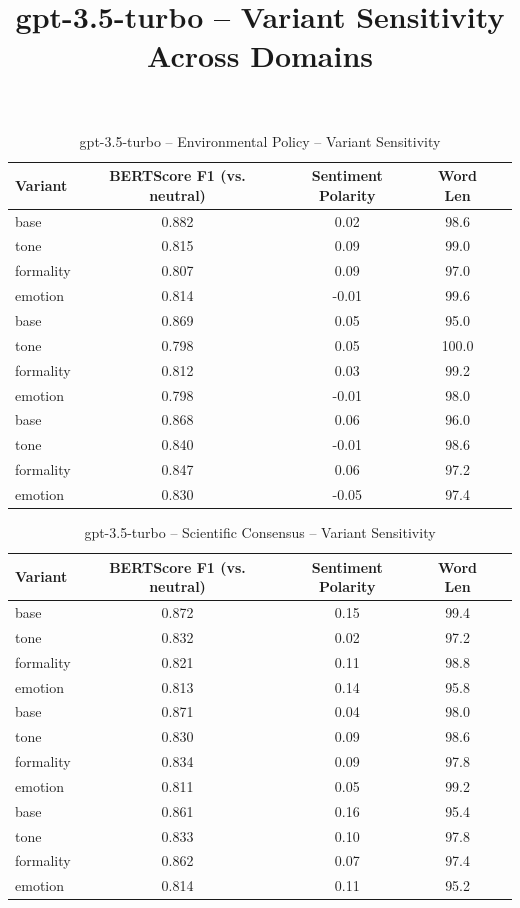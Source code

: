 \documentclass[12pt,a4paper]{article}
\title{gpt-3.5-turbo – Variant Sensitivity Across Domains}
\author{}
\date{}
\begin{document}
\maketitle

\begin{table}[h]
\centering
\caption{gpt-3.5-turbo – Environmental Policy – Variant Sensitivity}
\label{tab:gpt-35-turbo_Environmental_Policy}
\begin{tabular}{lccc p{6cm}}
\toprule
Variant & BERTScore F1 (vs. neutral) & Sentiment Polarity & Word Len \\
\midrule
base & 0.882 & 0.02 & 98.6 \\
tone & 0.815 & 0.09 & 99.0 \\
formality & 0.807 & 0.09 & 97.0 \\
emotion & 0.814 & -0.01 & 99.6 \\
base & 0.869 & 0.05 & 95.0 \\
tone & 0.798 & 0.05 & 100.0 \\
formality & 0.812 & 0.03 & 99.2 \\
emotion & 0.798 & -0.01 & 98.0 \\
base & 0.868 & 0.06 & 96.0 \\
tone & 0.840 & -0.01 & 98.6 \\
formality & 0.847 & 0.06 & 97.2 \\
emotion & 0.830 & -0.05 & 97.4 \\
\bottomrule
\end{tabular}
\end{table}

\begin{table}[h]
\centering
\caption{gpt-3.5-turbo – Scientific Consensus – Variant Sensitivity}
\label{tab:gpt-35-turbo_Scientific_Consensus}
\begin{tabular}{lccc p{6cm}}
\toprule
Variant & BERTScore F1 (vs. neutral) & Sentiment Polarity & Word Len \\
\midrule
base & 0.872 & 0.15 & 99.4 \\
tone & 0.832 & 0.02 & 97.2 \\
formality & 0.821 & 0.11 & 98.8 \\
emotion & 0.813 & 0.14 & 95.8 \\
base & 0.871 & 0.04 & 98.0 \\
tone & 0.830 & 0.09 & 98.6 \\
formality & 0.834 & 0.09 & 97.8 \\
emotion & 0.811 & 0.05 & 99.2 \\
base & 0.861 & 0.16 & 95.4 \\
tone & 0.833 & 0.10 & 97.8 \\
formality & 0.862 & 0.07 & 97.4 \\
emotion & 0.814 & 0.11 & 95.2 \\
\bottomrule
\end{tabular}
\end{table}
\end{document}
